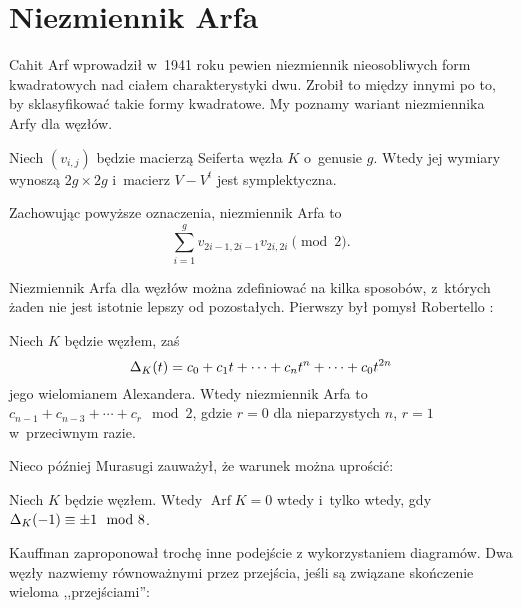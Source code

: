 
\section{Niezmiennik Arfa}
%

Cahit Arf wprowadził w~1941 roku pewien niezmiennik nieosobliwych form kwadratowych nad ciałem charakterystyki dwu.
%
Zrobił to między innymi po to, by sklasyfikować takie formy kwadratowe.
My poznamy wariant niezmiennika Arfy dla węzłów.

Niech $(v_{i,j})$ będzie macierzą Seiferta węzła $K$ o~genusie $g$.
Wtedy jej wymiary wynoszą $2g \times 2g$ i~macierz $V-V^t$ jest symplektyczna.

\begin{definition}
    Zachowując powyższe oznaczenia, niezmiennik Arfa to
    \begin{equation}
        \sum^g_{i=1}v_{2i-1,2i-1}v_{2i,2i} \pmod 2.
    \end{equation}
\end{definition}

Niezmiennik Arfa dla węzłów można zdefiniować na kilka sposobów, z~których żaden nie jest istotnie lepszy od pozostałych.
Pierwszy był pomysł Robertello \cite{robertello1965}:
%

\begin{proposition}[Robertello, 1965]
    Niech $K$ będzie węzłem, zaś
    \begin{equation}
        \Delta_K(t)=c_{0}+c_{1}t+\cdots +c_{n}t^{n}+\cdots +c_{0}t^{2n}
    \end{equation}
    jego wielomianem Alexandera.
    Wtedy niezmiennik Arfa to $c_{n-1}+c_{n-3}+\cdots +c_{r} \mod 2$, gdzie $r = 0$ dla nieparzystych $n$, $r = 1$ w~przeciwnym razie.
\end{proposition}

Nieco później Murasugi \cite{murasugi1969} zauważył, że warunek można uprościć:
%

\begin{proposition}[Murasugi, 1969]
    \label{prp:arf_murasugi}
    Niech $K$ będzie węzłem.
%
    Wtedy $\operatorname{Arf} K = 0$ wtedy i~tylko wtedy, gdy $\Delta_K(-1) \equiv \pm 1 \mod 8$.
\end{proposition}

Kauffman \cite[s. 143]{kauffman1983} zaproponował trochę inne podejście z wykorzystaniem diagramów.
%
Dwa węzły nazwiemy równoważnymi przez przejścia, jeśli są związane skończenie wieloma ,,przejściami'':
\begin{comment}
\[
    \LargeTwoPassMoveA \cong \LargeTwoPassMoveB
    \quad\mbox{albo}\quad
    \LargeTwoPassMoveC \cong \LargeTwoPassMoveD
\]
\end{comment}

